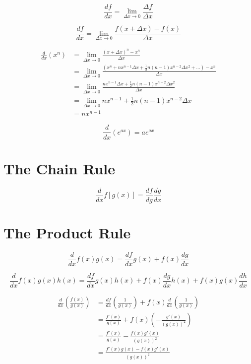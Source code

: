\documentclass[]{report}
\begin{document}
\begin{equation*}
    \frac{df}{dx} = \lim_{\Delta x \to 0} \frac{\Delta f}{\Delta x}
\end{equation*}

\begin{equation*}
    \frac{df}{dx} = \lim_{\Delta x \to 0} \frac{f(x + \Delta x) - f(x)}{\Delta x}
\end{equation*}

\begin{align*}
    \frac{d}{dx}(x^{n}) &= \lim_{\Delta x \to 0} \frac{(x + \Delta x)^{n} - x^{n}}{\Delta x}\\
    &= \lim_{\Delta x \to 0} \frac{(x^{n} + n x^{n-1}\Delta x + \frac{1}{2}n(n-1)x^{n-2}\Delta x^{2} +\dots) - x^{n}}{\Delta x}\\
    &= \lim_{\Delta x \to 0} \frac{n x^{n-1}\Delta x + \frac{1}{2}n(n-1)x^{n-2}\Delta x^{2}}{\Delta x}\\
    &= \lim_{\Delta x \to 0} n x^{n-1} + \frac{1}{2}n(n-1)x^{n-2}\Delta x\\
    &= n x^{n-1}
\end{align*}

\begin{equation*}
    \frac{d}{dx}(e^{ax}) = ae^{ax}
\end{equation*}

\section{The Chain Rule}

\begin{equation*}
    \frac{d}{dx}f[g(x)] = \frac{df}{dg} \frac{dg}{dx}
\end{equation*}

\section{The Product Rule}

\begin{equation*}
    \frac{d}{dx} f(x)g(x) = \frac{df}{dx} g(x) + f(x)\frac{dg}{dx}
\end{equation*}

\begin{equation*}
    \frac{d}{dx} f(x)g(x)h(x) = \frac{df}{dx} g(x)h(x) + f(x)\frac{dg}{dx} h(x) + f(x)g(x) \frac{dh}{dx}
\end{equation*}

\begin{align*}
    \frac{d}{dx}\left(\frac{f(x)}{g(x)}\right) &= \frac{df}{dx}\left(\frac{1}{g(x)}\right) + f(x)\frac{d}{dx}\left(\frac{1}{g(x)}\right)\\
    &= \frac{f'(x)}{g(x)} + f(x)\left(- \frac{g'(x)}{(g(x))^2}\right)\\
    &= \frac{f'(x)}{g(x)} - \frac{f(x)g'(x)}{(g(x))^{2}}\\
    &= \frac{f'(x)g(x) - f(x)g'(x)}{(g(x))^{2}}
\end{align*}
\end{document}
